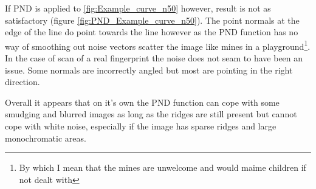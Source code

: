 \documentclass[11pt,a4paper]{article}
\begin{document}
\begin{multicols}{2}
		If PND is applied to \ref{fig:Example_curve_n50} however, result is not as satisfactory (figure \ref{fig:PND_Example_curve_n50}). The point normals at the edge of the line do point towards the line however as the PND function has no way of smoothing out noise vectors scatter the image like mines in a playground\footnote{By which I mean that the mines are unwelcome and would maime children if not dealt with}. In the case of scan of a real fingerprint the noise does not seam to have been an issue. Some normals are incorrectly angled but most are pointing in the right direction.

		Overall it appears that on it's own the PND function can cope with some smudging and blurred images as long as the ridges are still present but cannot cope with white noise, especially if the image has sparse ridges and large monochromatic areas.


\end{multicols}
\end{document}
